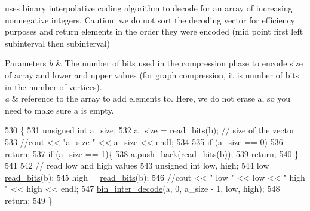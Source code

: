 uses binary interpolative coding algorithm to decode for an array of increasing nonnegative integers. Caution\+: we do not sort the decoding vector for efficiency purposes and return elements in the order they were encoded (mid point first left subinterval then subinterval) 


\begin{DoxyParams}{Parameters}
{\em b} & The number of bits used in the compression phase to encode size of array and lower and upper values (for graph compression, it is number of bits in the number of vertices). \\
\hline
{\em a} & reference to the array to add elements to. Here, we do not erase a, so you need to make sure a is empty. \\
\hline
\end{DoxyParams}

\begin{DoxyCode}
530                                                       \{
531   \textcolor{keywordtype}{unsigned} \textcolor{keywordtype}{int} a\_size;
532   a\_size = \hyperlink{classibitstream_a2fdcaecf10fefa6942dcd5286a2696e0}{read\_bits}(b); \textcolor{comment}{// size of the vector}
533   \textcolor{comment}{//cout << "a\_size " << a\_size << endl;}
534 
535   \textcolor{keywordflow}{if} (a\_size == 0)
536     \textcolor{keywordflow}{return};
537   \textcolor{keywordflow}{if} (a\_size == 1)\{
538     a.push\_back(\hyperlink{classibitstream_a2fdcaecf10fefa6942dcd5286a2696e0}{read\_bits}(b));
539     \textcolor{keywordflow}{return};
540   \}
541 
542   \textcolor{comment}{// read low and high values}
543   \textcolor{keywordtype}{unsigned} \textcolor{keywordtype}{int} low, high;
544   low = \hyperlink{classibitstream_a2fdcaecf10fefa6942dcd5286a2696e0}{read\_bits}(b);
545   high = \hyperlink{classibitstream_a2fdcaecf10fefa6942dcd5286a2696e0}{read\_bits}(b);
546   \textcolor{comment}{//cout << " low " << low << " high " << high << endl;}
547   \hyperlink{classibitstream_a4d1bfd02f98f6af2ac4d80034b23e26d}{bin\_inter\_decode}(a, 0, a\_size - 1, low, high);
548   \textcolor{keywordflow}{return};
549 \}
\end{DoxyCode}
\mbox{\label{classibitstream_a97983c20903c908fafb26e250bf9e812}} 
